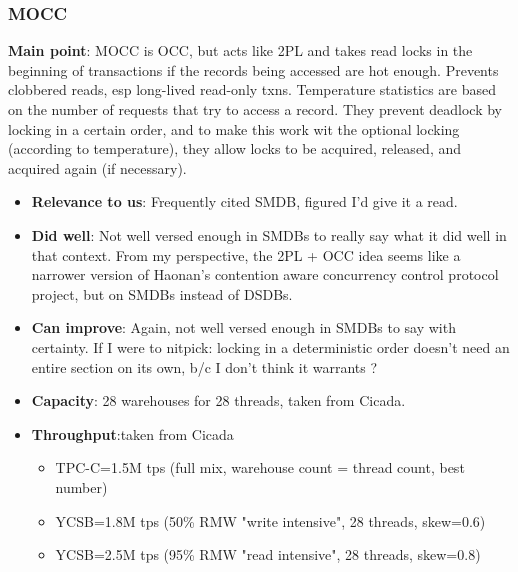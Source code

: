 \subsubsection{MOCC}
\textbf{Main point}: MOCC \cite{mocc} is OCC, but acts like 2PL and takes read locks in the beginning of transactions if the records being accessed are hot enough. Prevents clobbered reads, esp long-lived read-only txns. Temperature statistics are based on the number of requests that try to access a record. They prevent deadlock by locking in a certain order, and to make this work wit the optional locking (according to temperature), they allow locks to be acquired, released, and acquired again (if necessary).
\begin{itemize}
    \item \textbf{Relevance to us}: Frequently cited SMDB, figured I'd give it a read.
    \item \textbf{Did well}: Not well versed enough in SMDBs to really say what it did well in that context. From my perspective, the 2PL + OCC idea seems like a narrower version of Haonan's contention aware concurrency control protocol project, but on SMDBs instead of DSDBs.
    \item \textbf{Can improve}: Again, not well versed enough in SMDBs to say with certainty. If I were to nitpick: locking in a deterministic order doesn't need an entire section on its own, b/c I don't think it warrants ?
    \item\textbf{Capacity}: 28 warehouses for 28 threads, taken from Cicada.
    \item \textbf{Throughput}:taken from Cicada
    \begin{itemize}
        \item TPC-C=1.5M tps (full mix, warehouse count = thread count, best number)
        \item YCSB=1.8M tps (50\% RMW "write intensive", 28 threads, skew=0.6)
        \item YCSB=2.5M tps (95\% RMW "read intensive", 28 threads, skew=0.8)
    \end{itemize}
\end{itemize}

